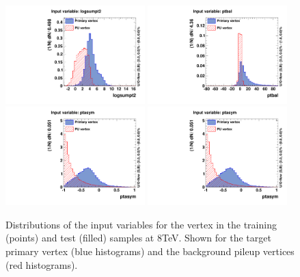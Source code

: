 \begin{figure}
  \includegraphics[width=0.48\textwidth]{analysis_comps/plots/vertex_bdt_input0.pdf}
  \includegraphics[width=0.48\textwidth]{analysis_comps/plots/vertex_bdt_input1.pdf} \\
  \includegraphics[width=0.48\textwidth]{analysis_comps/plots/vertex_bdt_input2.pdf}
  \includegraphics[width=0.48\textwidth]{analysis_comps/plots/vertex_bdt_input3.pdf}
  \caption{Distributions of the input variables for the vertex \BDT in the \MC \Hgg training (points) and test (filled) samples at 8TeV. Shown for the target primary vertex (blue histograms) and the background pileup vertices (red histograms). }
  \label{fig:vertex_bdt_inputs}
\end{figure}

